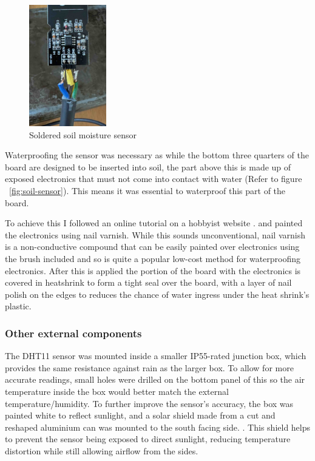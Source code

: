 \begin{figure}[H]
    \centering
    \includegraphics[width=0.3\textwidth]{contents/part-2/fig2/solder-soil.jpeg}
    \caption{Soldered soil moisture sensor}
    \label{fig:solder-soil}
\end{figure}

Waterproofing the sensor was necessary as while the bottom three quarters of the
board are designed to be inserted into soil, the part above this is made up of
exposed electronics that must not come into contact with water (Refer to figure
~\ref{fig:soil-sensor}). This means it was essential to waterproof this part of
the board.

To achieve this I followed an online tutorial on a hobbyist website
\cite{waterproof-sensor}. and painted the electronics using nail varnish. While
this sounds unconventional, nail varnish is a non-conductive compound that can
be easily painted over electronics using the brush included and so is quite a
popular low-cost method for waterproofing electronics. After this is applied the
portion of the board with the electronics is covered in heatshrink to form a
tight seal over the board, with a layer of nail polish on the edges to reduces
the chance of water ingress under the heat shrink's plastic.

\subsubsection{Other external components}

The DHT11 sensor was mounted inside a smaller IP55-rated junction box, which
provides the same resistance against rain as the larger box. To allow for more
accurate readings, small holes were drilled on the bottom panel of this so the
air temperature inside the box would better match the external
temperature/humidity. To further improve the sensor's accuracy, the box was
painted white to reflect sunlight, and a solar shield made from a cut and
reshaped aluminium can was mounted to the south facing side. . This shield helps
to prevent the sensor being exposed to direct sunlight, reducing temperature
distortion while still allowing airflow from the sides.

